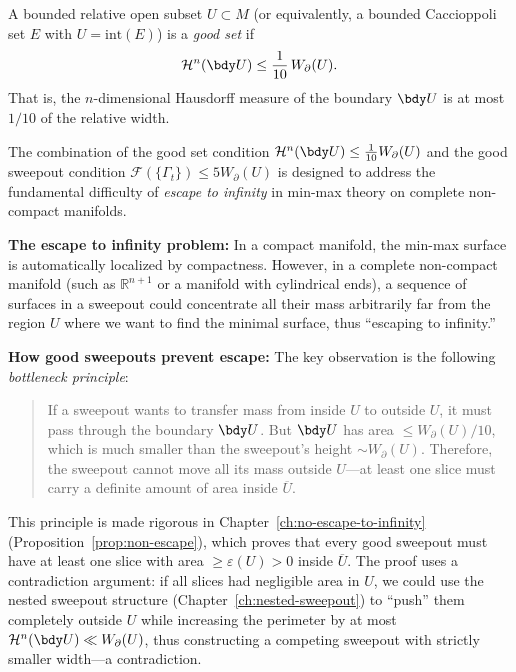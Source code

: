\begin{definition}\label{def:good-set}
A bounded relative open subset $U \subset M$ (or equivalently, a bounded Caccioppoli set $E$ with
$U = \mathrm{int}(E)$) is a \emph{good set} if
\[
    \mathcal{H}^n(\bdy U) \leq \frac{1}{10}\,W_\partial(U).
\]
That is, the $n$-dimensional Hausdorff measure of the boundary $\bdy U$ is at most $1/10$ of the relative
width.
\end{definition}
\begin{remark}\label{rem:good-sweepout-no-escape}
The combination of the good set condition $\mathcal{H}^n(\bdy U) \leq \frac{1}{10} W_\partial(U)$ and the good sweepout condition $\mathcal{F}(\{\Gamma_t\}) \leq 5 W_\partial(U)$ is designed to address the fundamental difficulty of \emph{escape to infinity} in min-max theory on complete non-compact manifolds.

\textbf{The escape to infinity problem:} In a compact manifold, the min-max surface is automatically localized by compactness. However, in a complete non-compact manifold (such as $\mathbb{R}^{n+1}$ or a manifold with cylindrical ends), a sequence of surfaces in a sweepout could concentrate all their mass arbitrarily far from the region $U$ where we want to find the minimal surface, thus ``escaping to infinity.''

\textbf{How good sweepouts prevent escape:} The key observation is the following \emph{bottleneck principle}:
\begin{quote}
If a sweepout wants to transfer mass from inside $U$ to outside $U$, it must pass through the boundary $\bdy U$. But $\bdy U$ has area $\leq W_\partial(U)/10$, which is much smaller than the sweepout's height $\sim W_\partial(U)$. Therefore, the sweepout cannot move all its mass outside $U$---at least one slice must carry a definite amount of area inside $\overline{U}$.
\end{quote}
This principle is made rigorous in Chapter~\ref{ch:no-escape-to-infinity} (Proposition~\ref{prop:non-escape}), which proves that every good sweepout must have at least one slice with area $\geq \varepsilon(U) > 0$ inside $\overline{U}$. The proof uses a contradiction argument: if all slices had negligible area in $U$, we could use the nested sweepout structure (Chapter~\ref{ch:nested-sweepout}) to ``push'' them completely outside $U$ while increasing the perimeter by at most $\mathcal{H}^n(\bdy U) \ll W_\partial(U)$, thus constructing a competing sweepout with strictly smaller width---a contradiction.
\end{remark}

